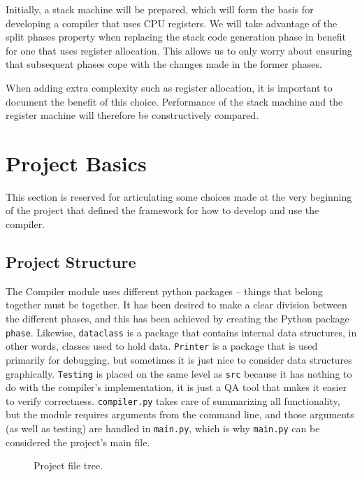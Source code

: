 Initially, a stack machine will be prepared, which will form the basis for developing a compiler that uses CPU registers. We will take advantage of the split phases property when replacing the stack code generation phase in benefit for one that uses register allocation. This allows us to only worry about ensuring that subsequent phases cope with the changes made in the former phases.

When adding extra complexity such as register allocation, it is important to document the benefit of this choice. Performance of the stack machine and the register machine will therefore be constructively compared.

\chapter{Project Basics}
This section is reserved for articulating some choices made at the very beginning of the project that defined the framework for how to develop and use the compiler.

\section{Project Structure}
The Compiler module uses different python packages -- things that belong together must be together. It has been desired to make a clear division between the different phases, and this has been achieved by creating the Python package \texttt{phase}. Likewise, \texttt{dataclass} is a package that contains internal data structures, in other words, classes used to hold data. \texttt{Printer} is a package that is used primarily for debugging, but sometimes it is just nice to consider data structures graphically. \texttt{Testing} is placed on the same level as \texttt{src} because it has nothing to do with the compiler's implementation, it is just a QA tool that makes it easier to verify correctness. \texttt{compiler.py} takes care of summarizing all functionality, but the module requires arguments from the command line, and those arguments (as well as testing) are handled in \texttt{main.py}, which is why \texttt{main.py} can be considered the project's main file.
\begin{figure}[H]
    \centering
    \begin{subfigure}{0.3\textwidth}
    \centering
    
    \end{subfigure}        
    \hfill
    \begin{subfigure}{0.3\textwidth}
    \centering
    
    \end{subfigure}
    \hfill
    \begin{subfigure}{0.3\textwidth}
    \centering
    
    \end{subfigure}
    \caption{Project file tree.}
\end{figure}


